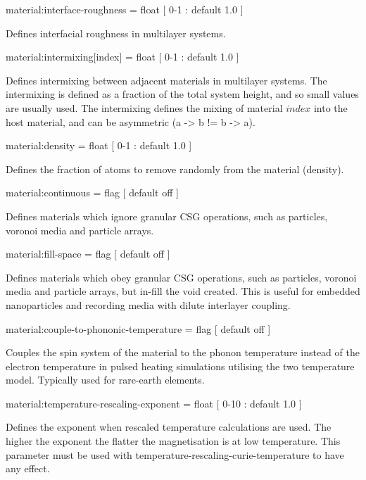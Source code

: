 {\zicf material:interface-roughness = float [ 0-1 : default 1.0 ]}
Defines interfacial roughness in multilayer systems.

{\zicf material:intermixing[index] = float [ 0-1 : default 1.0 ]}
Defines intermixing between adjacent materials in multilayer systems. The
intermixing is defined as a fraction of the total system height, and so small
values are usually used. The intermixing defines the mixing of material $index$
into the host material, and can be asymmetric (a -> b != b -> a).

{\zicf material:density = float [ 0-1 : default 1.0 ]}
 Defines the
fraction of atoms to remove randomly from the material (density).

{\zicf material:continuous = flag [ default off ]}
Defines materials which ignore granular CSG operations, such as particles,
voronoi media and particle arrays.

{\zicf material:fill-space = flag [ default off ]}
Defines materials which obey granular CSG operations, such as particles,
voronoi media and particle arrays, but in-fill the void created. This is
useful for embedded nanoparticles and recording media with dilute interlayer
coupling.

{\zicf material:couple-to-phononic-temperature = flag [ default off ]}
Couples the spin system of the material to the phonon temperature instead of the
electron temperature in pulsed heating simulations utilising the two temperature
model. Typically used for rare-earth elements.

{\zicf material:temperature-rescaling-exponent = float [ 0-10 : default 1.0 ]}
Defines the exponent when rescaled temperature calculations are used. The higher
the exponent the flatter the magnetisation is at low temperature. This parameter
must be used with temperature-rescaling-curie-temperature to have any effect.


